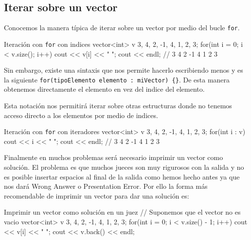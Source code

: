 \documentclass{article}
\begin{document}
    \subsection{Iterar sobre un vector}
    Conocemos la manera típica de iterar sobre un vector por medio del bucle \texttt{for}.
    \begin{codelisting}{Iteración con \texttt{for} con indices}
vector<int> v {3, 4, 2, -1, 4, 1, 2, 3};
for(int i = 0; i < v.size(); i++) {
    cout << v[i] << " ";
} 
cout << endl; // 3 4 2 -1 4 1 2 3
    \end{codelisting}

    Sin embargo, existe una sintaxis que nos permite hacerlo escribiendo menos y es la siguiente
    \texttt{for(tipoElemento elemento : miVector) \{\}}. De esta manera obtenemos directamente el elemento
    en vez del indice del elemento.
    
    Esta notación nos permitirá iterar sobre otras estructuras donde
    no tenemos acceso directo a los elementos por medio de indices. 

    \begin{codelisting}{Iteración con \texttt{for} con iteradores}
vector<int> v {3, 4, 2, -1, 4, 1, 2, 3};
for(int i : v) {
    cout << i << " ";
} 
cout << endl; // 3 4 2 -1 4 1 2 3
    \end{codelisting}

    Finalmente en muchos problemas será necesario imprimir un vector como solución. El problema es que
    muchos jueces son muy rigurosos con la salida y no es posible insertar espacios al final de la salida
    como hemos hecho antes ya que nos dará Wrong Answer o Presentation Error. Por ello la forma más recomendable
    de imprimir un vector para dar una solución es:

    \begin{codelisting}{Imprimir un vector como solución en un juez}
// Suponemos que el vector no es vacio
vector<int> v {3, 4, 2, -1, 4, 1, 2, 3};
for(int i = 0; i < v.size() - 1; i++) {
    cout << v[i] << " ";
} 
cout << v.back() << endl;
            \end{codelisting}
\end{document}
